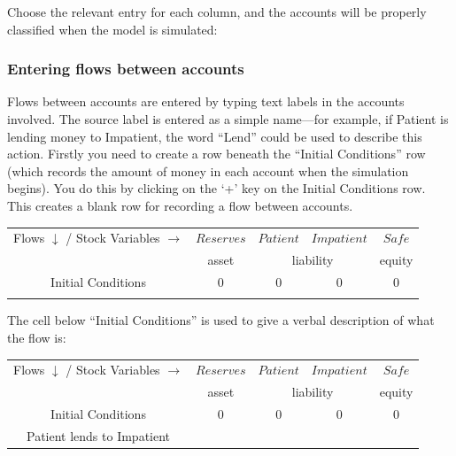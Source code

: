 Choose the relevant entry for each column, and the accounts will be properly classified when the model is simulated:

\begin{center}
\end{center}

\subsubsection{Entering flows between accounts}


Flows between accounts are entered by typing text labels in the
accounts involved. The source label is entered as a simple name---for
example, if Patient is lending money to Impatient, the word ``Lend''
could be used to describe this action. Firstly you need to create a
row beneath the ``Initial Conditions'' row (which records the amount of
money in each account when the simulation begins). You do this by
clicking on the `+' key on the Initial Conditions row. This creates a
blank row for recording a flow between accounts.

\begin{center}
\begin{tabular}{|c|cccc|}
\hline
Flows $\downarrow$ / Stock Variables $\rightarrow$&\multicolumn{1}{|c|}{$Reserves$}&\multicolumn{1}{|c|}{$Patient$}&\multicolumn{1}{|c|}{$Impatient$}&\multicolumn{1}{|c|}{$Safe$}\\\cline{2-5}&\multicolumn{1}{|c|}{asset}&\multicolumn{2}{|c|}{liability}&\multicolumn{1}{|c|}{equity}\\\hline
Initial Conditions&$0$&$0$&$0$&$0$\\
&&&&\\
\hline
\end{tabular}
\end{center}

The cell below ``Initial Conditions'' is used to give a verbal
description of what the flow is: 

\begin{center}
\begin{tabular}{|c|cccc|}
\hline
Flows $\downarrow$ / Stock Variables $\rightarrow$&\multicolumn{1}{|c|}{$Reserves$}&\multicolumn{1}{|c|}{$Patient$}&\multicolumn{1}{|c|}{$Impatient$}&\multicolumn{1}{|c|}{$Safe$}\\\cline{2-5}&\multicolumn{1}{|c|}{asset}&\multicolumn{2}{|c|}{liability}&\multicolumn{1}{|c|}{equity}\\\hline
Initial Conditions&$0$&$0$&$0$&$0$\\
Patient lends to Impatient&&&&\\
\hline
\end{tabular}
\end{center}

